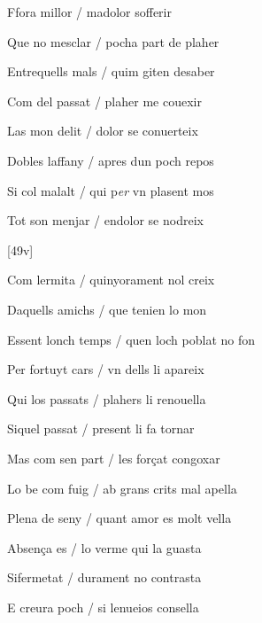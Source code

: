 \begin{estrofa}

 Ffora millor / madolor sofferir

 Que no mesclar / pocha part de plaher

 Entrequells mals / quim giten desaber

 Com del passat / plaher me couexir

 Las mon delit / dolor se conuerteix

 Dobles laffany / apres dun poch repos

 Si col malalt / qui p\textit{er} vn plasent mos

 Tot son menjar / endolor se nodreix

\end{estrofa}



[49v]
\begin{estrofa}

 Com lermita / quinyorament nol creix

 Daquells amichs / que tenien lo mon

 Essent lonch temps / quen loch poblat no fon

 Per fortuyt cars / vn dells li apareix

 Qui los passats / plahers li renouella

 Siquel passat / present li fa tornar

 Mas com sen part / les for\c{c}at congoxar

 Lo be com fuig / ab grans crits mal apella

\end{estrofa}


\begin{tornada}

 Plena de seny / quant amor es molt vella

 Absen\c{c}a es / lo verme qui la guasta

 Sifermetat / durament no contrasta

 E creura poch / si lenueios consella

\end{tornada}




